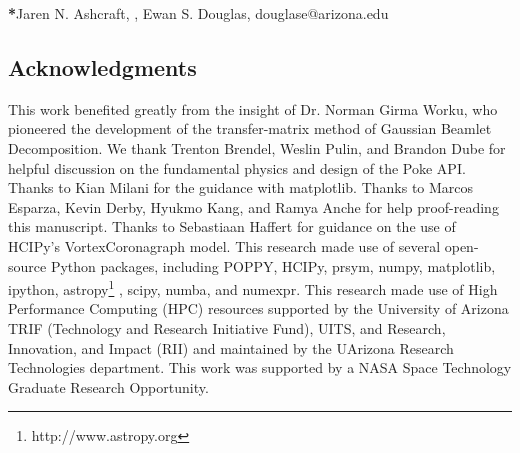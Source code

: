 \documentclass[12pt]{spieman}  %
\begin{document}
{\noindent \footnotesize\textbf{*}Jaren N. Ashcraft,  , Ewan S. Douglas, douglase@arizona.edu }

\begin{spacing}{2}   %









\section{Acknowledgments}
This work benefited greatly from the insight of Dr. Norman Girma Worku, who pioneered the development of the transfer-matrix method of Gaussian Beamlet Decomposition. We thank Trenton Brendel, Weslin Pulin, and Brandon Dube for helpful discussion on the fundamental physics and design of the Poke API. Thanks to Kian Milani for the guidance with matplotlib. Thanks to Marcos Esparza, Kevin Derby, Hyukmo Kang, and Ramya Anche for help proof-reading this manuscript. Thanks to Sebastiaan Haffert for guidance on the use of HCIPy's VortexCoronagraph model. This research made use of several open-source Python packages, including POPPY\cite{Perrin12}, HCIPy\cite{por2018hcipy}, prsym\cite{Dube2019}, numpy\cite{harris2020array}, matplotlib\cite{Hunter:2007}, ipython\cite{PER-GRA:2007}, astropy\footnote{http://www.astropy.org} \cite{astropy:2013, astropy:2018, astropy:2022},  scipy\cite{2020SciPy-NMeth}, numba\cite{lam_numba_2015}, and numexpr\cite{robert_mcleod_2018_2483274}. This research made use of High Performance Computing (HPC) resources supported by the University of Arizona TRIF (Technology and Research Initiative Fund), UITS, and Research, Innovation, and Impact (RII) and maintained by the UArizona Research Technologies department. This work was supported by a NASA Space Technology Graduate Research Opportunity.



\end{spacing}
\end{document}
